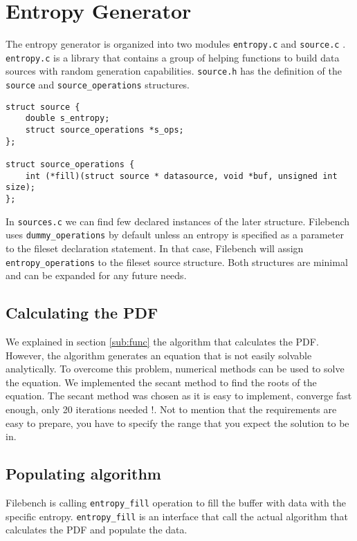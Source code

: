 \section{Entropy Generator}\label{sec:ent_imp}

The entropy generator is organized into two modules \verb+entropy.c+ and \verb+source.c+ . \verb+entropy.c+ is a library that contains a group of helping functions to build
 data sources with random generation capabilities. \verb+source.h+ has the definition of the \verb+source+ and \verb+source_operations+ structures.
\lstset{language=C}
\begin{lstlisting}
struct source {
    double s_entropy;
    struct source_operations *s_ops; 
};

struct source_operations {
    int (*fill)(struct source * datasource, void *buf, unsigned int size);
};

\end{lstlisting}


 In \verb+sources.c+ we can find few declared instances of the later structure. Filebench uses \verb+dummy_operations+ by default unless an entropy is specified as a parameter to the fileset declaration statement.
 In that case, Filebench will assign \verb+entropy_operations+ to the fileset source structure. Both structures are minimal and can be expanded for any future needs.

\subsection{Calculating the PDF}

We explained in section \ref{sub:func} the algorithm that calculates the PDF.
However, the algorithm generates an equation that is not easily solvable analytically.
 To overcome this problem, numerical methods can be used to solve the equation. We implemented the secant method to find the roots of the equation. The secant method was chosen as it is easy to implement, converge fast enough, only 20 iterations needed !.
 Not to mention that the requirements are easy to prepare, you have to specify the range that you expect the solution to be in.


\subsection{Populating algorithm}

Filebench is calling \verb+entropy_fill+ operation to fill the buffer with data with the specific entropy. \verb+entropy_fill+ is an interface that call the actual algorithm that calculates the PDF and populate the data.

